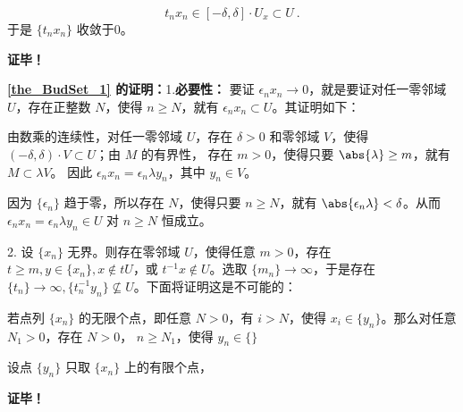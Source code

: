 \begin{equation}
t_nx_n\in[-\delta,\delta]\cdot U_x\subset U~.
\end{equation}
于是 $\{t_nx_n\}$ 收敛于0。

\textbf{证毕！}

\textbf{\autoref{the_BudSet_1} 的证明：}1.\textbf{必要性：} 要证 $\epsilon_n x_n\rightarrow0$，就是要证对任一零邻域 $U$，存在正整数 $N$，使得 $n\geq N$，就有 $\epsilon_n x_n\subset U$。其证明如下：

由数乘的连续性，对任一零邻域 $U$，存在 $\delta>0$ 和零邻域 $V$，使得 $(-\delta,\delta)\cdot V\subset U$；由 $M$ 的有界性， 存在 $m>0$，使得只要 $\abs{\lambda}\geq m$，就有 $M\subset\lambda V$。 因此 $\epsilon_nx_n=\epsilon_n \lambda y_n$，其中 $y_n\in V$。

因为 $\{\epsilon_n\}$ 趋于零，所以存在 $N$，使得只要 $n\geq N$，就有 $\abs{\epsilon_n\lambda}<\delta$。从而 $\epsilon_nx_n=\epsilon_n \lambda y_n\in U$ 对 $n\geq N$ 恒成立。


2. 设 $\{x_n\}$ 无界。则存在零邻域 $U$，使得任意 $m>0$，存在 $t\geq m,y\in\{x_n\},x\notin tU$，或 $t^{-1}x\notin U$。选取 $\{m_n\}\rightarrow\infty$，于是存在 $\{t_n\}\rightarrow\infty,\{t_n^{-1}y_n\}\nsubseteq U$。下面将证明这是不可能的：

若点列 $\{x_n\}$ 的无限个点，即任意 $N>0$，有 $i>N$，使得 $x_i\in\{y_n\}$。那么对任意 $N_1>0$，存在 $N>0$， $n\geq N_1$，使得 $y_n\in\{\}$

 设点 $\{y_n\}$ 只取 $\{x_n\}$ 上的有限个点，


\textbf{证毕！}











